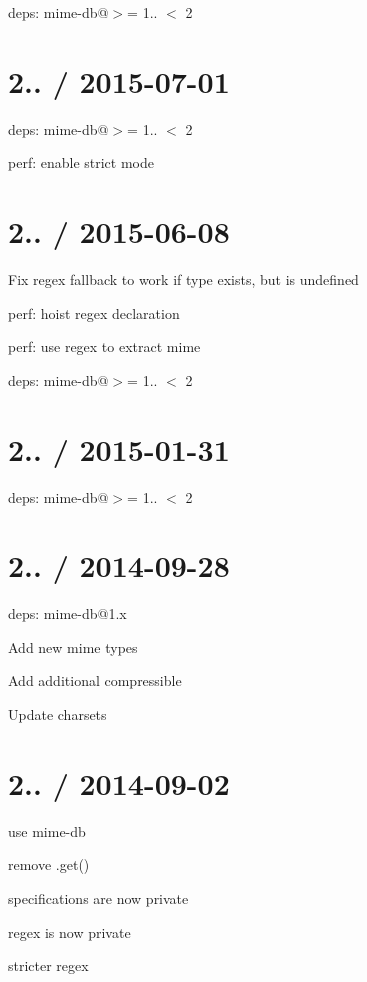 \begin{DoxyItemize}
\item deps\+: mime-\/db@\textquotesingle{}$>$= 1.. $<$ 2\textquotesingle{}
\end{DoxyItemize}

\section*{2.. / 2015-\/07-\/01 }


\begin{DoxyItemize}
\item deps\+: mime-\/db@\textquotesingle{}$>$= 1.. $<$ 2\textquotesingle{}
\item perf\+: enable strict mode
\end{DoxyItemize}

\section*{2.. / 2015-\/06-\/08 }


\begin{DoxyItemize}
\item Fix regex fallback to work if type exists, but is undefined
\item perf\+: hoist regex declaration
\item perf\+: use regex to extract mime
\item deps\+: mime-\/db@\textquotesingle{}$>$= 1.. $<$ 2\textquotesingle{}
\end{DoxyItemize}

\section*{2.. / 2015-\/01-\/31 }


\begin{DoxyItemize}
\item deps\+: mime-\/db@\textquotesingle{}$>$= 1.. $<$ 2\textquotesingle{}
\end{DoxyItemize}

\section*{2.. / 2014-\/09-\/28 }


\begin{DoxyItemize}
\item deps\+: mime-\/db@1.\+x
\begin{DoxyItemize}
\item Add new mime types
\item Add additional compressible
\item Update charsets
\end{DoxyItemize}
\end{DoxyItemize}

\section*{2.. / 2014-\/09-\/02 }


\begin{DoxyItemize}
\item use mime-\/db
\item remove .get()
\item specifications are now private
\item regex is now private
\item stricter regex 
\end{DoxyItemize}